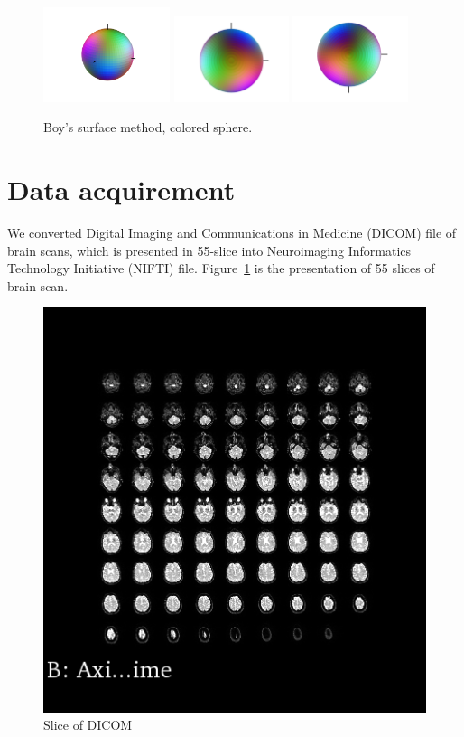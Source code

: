 \documentclass[hyperref, plainreport, noproblem]{cgvpub1}
\begin{document}
	\begin{figure}
		\centering
		\includegraphics[width=0.33\textwidth]{boys}
		\includegraphics[width=0.3\textwidth]{boys_zIn_yRight}
		\includegraphics[width=0.3\textwidth]{boys_zOut_yRight}
		\caption{Boy's surface method, colored sphere.}
	\end{figure}

\section{Data acquirement}
We converted Digital Imaging and Communications in Medicine (DICOM) file of brain scans, which is presented in 55-slice into Neuroimaging Informatics Technology Initiative (NIFTI) file. Figure~\ref{fig:2} is the presentation of 55 slices of brain scan.

\begin{figure}[ht]
    \centering
    \includegraphics[width = 0.6\columnwidth]{2}
    \caption{ Slice of DICOM}
    \label{fig:2}
\end{figure}	
\end{document}
